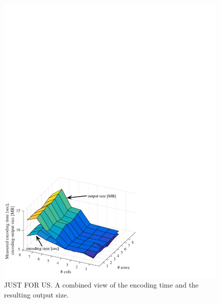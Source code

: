 \begin{figure}[t]
	\includegraphics[width=\columnwidth]{figures/times_size_combined_v1.pdf}
	\caption{JUST FOR US. A combined view of the encoding time and the resulting output size.}
\end{figure}
